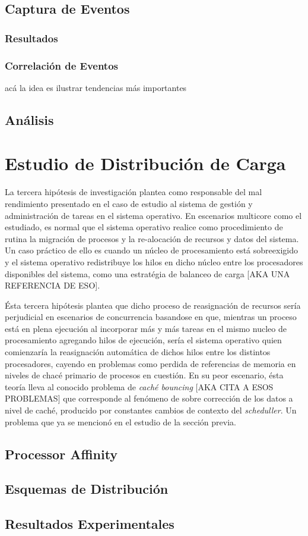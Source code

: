 \subsection{Captura de Eventos}
\subsubsection{Resultados}
\subsubsection{Correlación de Eventos}
acá la idea es ilustrar tendencias más importantes
\subsection{Análisis}

\section{Estudio de Distribución de Carga}
La tercera hipótesis de investigación plantea como responsable del mal rendimiento presentado en el caso de estudio al sistema de gestión y administración de tareas en el sistema operativo. En escenarios multicore como el estudiado, es normal que el sistema operativo realice como procedimiento de rutina la migración de procesos y la re-alocación de recursos y datos del sistema. Un caso práctico de ello es cuando un núcleo de procesamiento está sobreexigido y el sistema operativo redistribuye los hilos en dicho núcleo entre los procesadores disponibles del sistema, como una estratégia de balanceo de carga [AKA UNA REFERENCIA DE ESO].

Ésta tercera hipótesis plantea que dicho proceso de reasignación de recursos sería perjudicial en escenarios de concurrencia basandose en que, mientras un proceso está en plena ejecución al incorporar más y más tareas en el mismo nucleo de procesamiento agregando hilos de ejecución, sería el sistema operativo quien comienzaría la reasignación automática de dichos hilos entre los distintos procesadores, cayendo en problemas como perdida de referencias de memoria en niveles de chacé primario de procesos en cuestión. En su peor escenario, ésta teoría lleva al conocido problema de \emph{caché bouncing} [AKA CITA A ESOS PROBLEMAS] que corresponde al fenómeno de sobre corrección de los datos a nivel de caché, producido por constantes cambios de contexto del \emph{scheduller}. Un problema que ya se mencionó en el estudio de la sección previa.

\subsection{Processor Affinity}
\subsection{Esquemas de Distribución}
\subsection{Resultados Experimentales}
